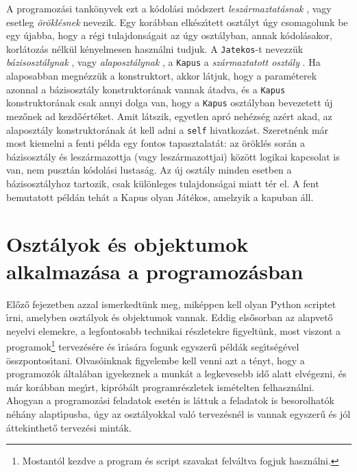 A programoz\'asi tank\"onyvek ezt a k\'odol\'asi m\'odszert {\sl lesz\'armaztat\'asnak} , 
vagy esetleg {\sl \"or\"okl\'esnek}  nevezik. Egy kor\'abban elk\'esz\'{\i}tett 
oszt\'alyt \'ugy csomagolunk be egy \'ujabba, hogy a r\'egi tulajdons\'agait az \'ugy oszt\'alyban, annak 
k\'odol\'asakor, korl\'atoz\'as n\'elk\"ul k\'enyelmesen haszn\'alni tudjuk. A {\tt Jatekos}-t nevezz\"uk 
{\sl b\'azis\-osz\-t\'aly\-nak} , vagy {\sl alaposzt\'alynak } , 
a {\tt Kapus} a {\sl sz\'armaztatott oszt\'aly} . Ha alaposabban megn\'ezz\"uk 
a konstruktort, akkor l\'atjuk, hogy a param\'eterek azonnal a b\'azisoszt\'aly konstruktor\'anak vannak 
\'atadva, \'es a {\tt Kapus} konstruktor\'anak csak annyi dolga van, hogy a {\tt Kapus} oszt\'alyban bevezetett 
\'uj mez\H{o}nek ad kezd\H{o}\'ert\'eket. Amit l\'atszik, egyetlen apr\'o neh\'ezs\'eg az\'ert akad, az alaposzt\'aly 
konstruktor\'anak \'at kell adni a {\tt self} hivatkoz\'ast. Szeretn\'enk m\'ar most kiemelni a fenti p\'elda egy fontos 
tapasztalat\'at: az \"or\"okl\'es sor\'an a b\'azisoszt\'aly \'es lesz\'armazottja (vagy lesz\'armazottjai) k\"oz\"ott 
logikai kapcsolat is van, nem puszt\'an k\'odol\'asi lustas\'ag. Az \'uj oszt\'aly minden esetben a b\'azisoszt\'alyhoz 
tartozik, csak k\"ul\"onleges tulajdons\'agai miatt t\'er el. A fent bemutatott p\'eld\'an teh\'at a Kapus olyan J\'at\'ekos, 
amelzyik a kapuban \'all.

\section{Oszt\'alyok \'es objektumok alkalmaz\'asa a programoz\'asban}

El\H{o}z\H{o} fejezetben azzal ismerkedt\"unk meg, mik\'eppen kell olyan Python scriptet \'{\i}rni, amelyben 
oszt\'alyok \'es objektumok vannak. Eddig els\H{o}sorban az alapvet\H{o} neyelvi elemekre, a legfontosabb technikai 
r\'eszletekre figyelt\"unk, most viszont a programok\footnote{Mostant\'ol kezdve a program \'es script szavakat 
felv\'altva fogjuk haszn\'alni.} tervez\'es\'ere \'es \'{\i}r\'as\'ara fogunk egyszer\H{u} p\'eld\'ak seg\'{\i}ts\'eg\'evel 
\"osszpontos\'{\i}tani. Olvas\'oinknak figyelembe kell venni azt a t\'enyt, hogy a programoz\'ok \'altal\'aban igyekeznek 
a munk\'at a legke\-ve\-sebb id\H{o} alatt elv\'egezni, \'es m\'ar kor\'abban meg\'{\i}rt, kipr\'ob\'alt programr\'eszletek 
ism\'etelten felhaszn\'alni. Ahogyan a programoz\'asi feladatok eset\'en is l\'attuk a feladatok is besorolhat\'ok 
n\'eh\'any alapt\'{\i}pusba, \'ugy az oszt\'alyokkal val\'o tervez\'esn\'el is vannak egyszer\H{u} \'es j\'ol 
\'attekinthet\H{o} tervez\'esi mint\'ak.

